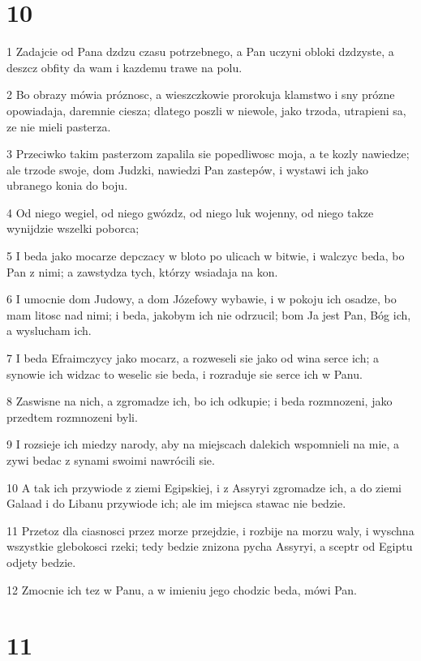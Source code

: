 \chapter{10}

\par 1 Zadajcie od Pana dzdzu czasu potrzebnego, a Pan uczyni obloki dzdzyste, a deszcz obfity da wam i kazdemu trawe na polu.
\par 2 Bo obrazy mówia próznosc, a wieszczkowie prorokuja klamstwo i sny prózne opowiadaja, daremnie ciesza; dlatego poszli w niewole, jako trzoda, utrapieni sa, ze nie mieli pasterza.
\par 3 Przeciwko takim pasterzom zapalila sie popedliwosc moja, a te kozly nawiedze; ale trzode swoje, dom Judzki, nawiedzi Pan zastepów, i wystawi ich jako ubranego konia do boju.
\par 4 Od niego wegiel, od niego gwózdz, od niego luk wojenny, od niego takze wynijdzie wszelki poborca;
\par 5 I beda jako mocarze depczacy w bloto po ulicach w bitwie, i walczyc beda, bo Pan z nimi; a zawstydza tych, którzy wsiadaja na kon.
\par 6 I umocnie dom Judowy, a dom Józefowy wybawie, i w pokoju ich osadze, bo mam litosc nad nimi; i beda, jakobym ich nie odrzucil; bom Ja jest Pan, Bóg ich, a wyslucham ich.
\par 7 I beda Efraimczycy jako mocarz, a rozweseli sie jako od wina serce ich; a synowie ich widzac to weselic sie beda, i rozraduje sie serce ich w Panu.
\par 8 Zaswisne na nich, a zgromadze ich, bo ich odkupie; i beda rozmnozeni, jako przedtem rozmnozeni byli.
\par 9 I rozsieje ich miedzy narody, aby na miejscach dalekich wspomnieli na mie, a zywi bedac z synami swoimi nawrócili sie.
\par 10 A tak ich przywiode z ziemi Egipskiej, i z Assyryi zgromadze ich, a do ziemi Galaad i do Libanu przywiode ich; ale im miejsca stawac nie bedzie.
\par 11 Przetoz dla ciasnosci przez morze przejdzie, i rozbije na morzu waly, i wyschna wszystkie glebokosci rzeki; tedy bedzie znizona pycha Assyryi, a sceptr od Egiptu odjety bedzie.
\par 12 Zmocnie ich tez w Panu, a w imieniu jego chodzic beda, mówi Pan.

\chapter{11}

